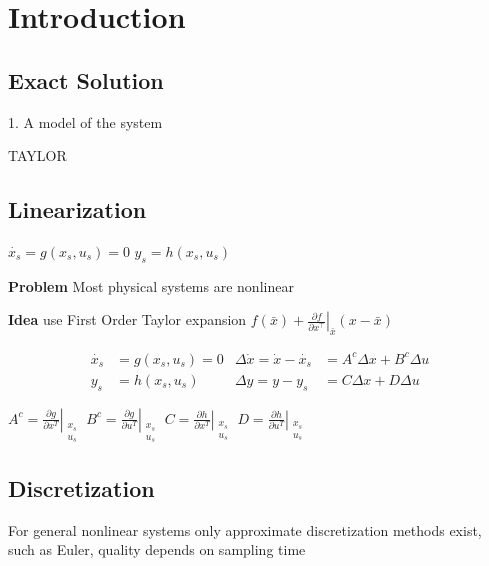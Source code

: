 \section{Introduction}


\subsection{Exact  Solution}

1. A model of the system

TAYLOR %

\subsection{Linearization}

$\dot{x_s}=g(x_s,u_s) = 0$
$y_s= h(x_s,u_s)$

\textbf{Problem} Most physical systems are nonlinear

\textbf{Idea} use First Order Taylor expansion
$f(\bar{x}) + \left. \frac{\partial f}{\partial x^\top} \right
	\rvert_{\bar{x}} (x-\bar{x})$

\[\begin{aligned}
		\dot{x_s} & =g(x_s,u_s) = 0
		          & \Delta \dot{x}  =\dot{x} -\dot{x_s}
		          & = A^c\Delta x + B^c\Delta u
		\\
		y_s       & = h(x_s,u_s)
		          & \Delta y        = y - y_s
		          & = C\Delta x + D\Delta u
	\end{aligned} \]

$A^c= \left.\frac{\partial g}{\partial x^T}\right|_{\substack{x_s \\u_s}} $
$B^c= \left.\frac{\partial g}{\partial u^T}\right|_{\substack{x_s \\u_s}} $
$C= \left.\frac{\partial h}{\partial x^T}\right|_{\substack{x_s \\u_s}} $
$D= \left.\frac{\partial h}{\partial u^T}\right|_{\substack{x_s \\u_s}} $


\subsection{Discretization}

For general nonlinear systems only approximate discretization methods
exist, such as Euler, quality depends on sampling time

